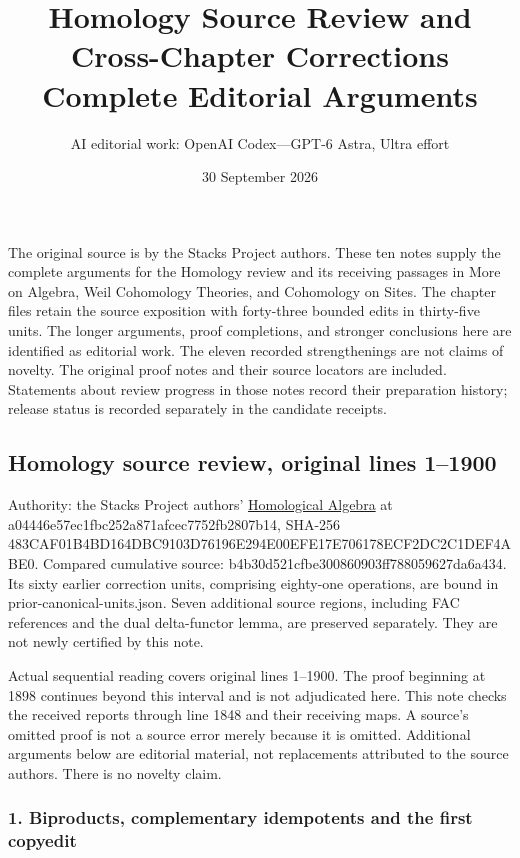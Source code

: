 \documentclass[11pt]{article}
\title{Homology Source Review and Cross-Chapter Corrections\\Complete Editorial Arguments}
\author{AI editorial work: OpenAI Codex---GPT-6 Astra, Ultra effort}
\date{30 September 2026}
\begin{document}
\maketitle
\noindent
The original source is by the Stacks Project authors. These ten notes
supply the complete arguments for the Homology review and its receiving
passages in More on Algebra, Weil Cohomology Theories, and Cohomology on
Sites. The chapter files retain the source exposition with forty-three
bounded edits in thirty-five units. The longer arguments, proof
completions, and stronger conclusions here are identified as editorial
work. The eleven recorded strengthenings are not claims of novelty.
The original proof notes and their source locators are included. Statements
about review progress in those notes record their preparation history;
release status is recorded separately in the candidate receipts.
\setcounter{secnumdepth}{1}
\tableofcontents
\subsection{Homology source review, original lines 1--1900}\label{homology-source-review-original-lines-11900}

Authority: the Stacks Project authors' \href{https://github.com/stacks/stacks-project/blob/a04446e57ec1fbc252a871afcec7752fb2807b14/homology.tex}{Homological Algebra} at a04446e57ec1fbc252a871afcec7752fb2807b14, SHA-256 483CAF01B4BD164DBC9103D76196E294E00EFE17E706178ECF2DC2C1DEF4ABE0. Compared cumulative source: b4b30d521cfbe300860903ff788059627da6a434. Its sixty earlier correction units, comprising eighty-one operations, are bound in prior-canonical-units.json. Seven additional source regions, including FAC references and the dual delta-functor lemma, are preserved separately. They are not newly certified by this note.

Actual sequential reading covers original lines 1--1900. The proof beginning at 1898 continues beyond this interval and is not adjudicated here. This note checks the received reports through line 1848 and their receiving maps. A source's omitted proof is not a source error merely because it is omitted. Additional arguments below are editorial material, not replacements attributed to the source authors. There is no novelty claim.

\subsubsection{1. Biproducts, complementary idempotents and the first copyedit}\label{biproducts-complementary-idempotents-and-the-first-copyedit}
\end{document}
